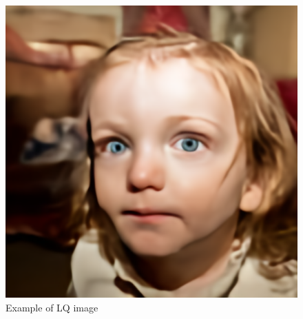\begin{figure}[htbp]
\begin{minipage}{0.45\textwidth}
        \includegraphics[width=\textwidth]{imgs/output_00386.png}
        \caption{Example of LQ image}
        \label{fig:image2}
    \end{minipage}
\end{figure}

